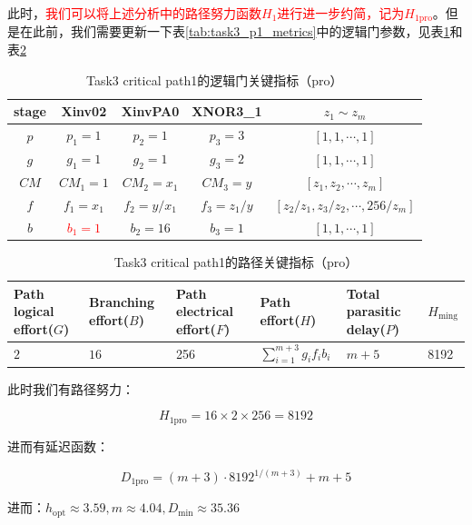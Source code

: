 \documentclass[UTF8,12pt,a4paper]{ctexart}
\begin{document}
此时，\textcolor{red}{我们可以将上述分析中的路径努力函数$H_1$进行进一步约简，记为$H_{\text{1pro}}$}。但是在此前，我们需要更新一下表\ref{tab:task3_p1_metrics}中的逻辑门参数，见表\ref{tab:task3_p1_pro_metrics}和表\ref{tab:task3_p1_pro_path_metrics}


\begin{table}[htbp]
    \centering
    \caption{Task3 critical path1的逻辑门关键指标（pro）}
    \label{tab:task3_p1_pro_metrics}
    \begin{tabular}{ccccc}
    \toprule
    stage & Xinv02 & XinvPA0 & XNOR3\_1 & $z_1 \sim z_m$ \\
    \midrule
    $p$ & $p_1 = 1$ & $p_2 = 1$ & $p_3 = 3$ & $[1,1,\cdots ,1]$ \\
    $g$ & $g_1 = 1$ & $g_2 = 1$ & $g_3 = 2$ & $[1,1,\cdots ,1]$ \\
    $CM$ & $CM_1 = 1$ & $CM_2 = x_1$ & $CM_3 = y$ & $[z_1, z_2, \cdots, z_m]$ \\
    $f$ & $f_1 = x_1$ & $f_2 = y/x_1$ & $f_3 = z_{1}/y$ & $[z_{2}/z_{1}, z_{3}/z_{2}, \cdots, 256/z_{m}]$ \\
    $b$ & \textcolor{red}{$b_1 = 1$} & $b_2 = 16$ & $b_3 = 1$ & $[1,1,\cdots ,1]$ \\
    \bottomrule
    \end{tabular}
\end{table}


\begin{table}[htbp]
    \centering
    \caption{Task3 critical path1的路径关键指标（pro）}
    \label{tab:task3_p1_pro_path_metrics}
    \begin{tabularx}{\linewidth}{XXXXXX}
    \toprule
    Path logical effort($G$) & Branching effort($B$) &
    Path electrical effort($F$) & Path effort($H$) &
    Total parasitic delay($P$) & $H_{\text{ming}}$\\
    \midrule
    $2$ & $16$ & 256 & $\sum_{i=1}^{m+3}{g_i f_i b_i}$ & $m+5$ & 8192 \\
    \bottomrule
    \end{tabularx}
\end{table}

此时我们有路径努力：

$$H_{\text{1pro}} = 16 \times 2 \times 256 = 8192$$

进而有延迟函数：

$$D_{\text{1pro}} = (m+3) \cdot 8192^{1/(m+3)} + m + 5$$

进而：$h_{\text{opt}} \approx 3.59, m \approx 4.04, D_{\text{min}} \approx 35.36$
\end{document}
